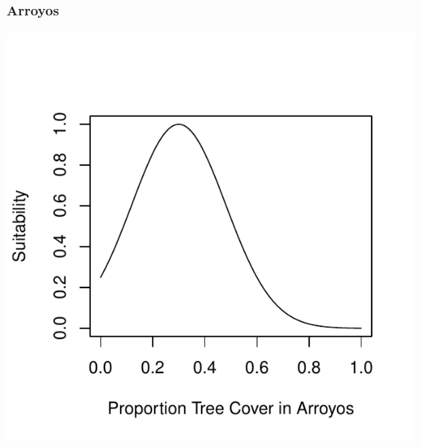 \documentclass[12pt,letterpaper]{article}\usepackage{graphicx, color}
\makeatletter
\def\maxwidth{ %
  \ifdim\Gin@nat@width>\linewidth
    \linewidth
  \else
    \Gin@nat@width
  \fi
}
\newenvironment{knitrout}{}{} %
\makeatother
\begin{document}
\subsubsection{Arroyos}
\begin{knitrout}
\color{fgcolor}\includegraphics[width=\maxwidth]{figure/Sally-Dan_Tree_Cover_arroyo} 
\end{knitrout}
\end{document}
